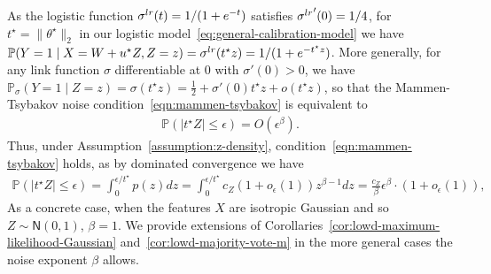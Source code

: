 \documentclass[11pt]{article}
\newcommand{\Prb}{\mathbb{P}}
\newcommand{\normal}{\mathsf{N}}
\newcommand{\lr}{^{\textup{lr}}}
\newcommand{\norms}[1]{\|{#1}\|} %
\newcommand{\ltwos}[1]{\norms{#1}_2} %
\newcommand{\<}{\langle} %
\renewcommand{\>}{\rangle}
\newcommand{\half}{\frac{1}{2}}
\newcommand{\opt}{^\star}
\begin{document}
As the logistic function $\sigma\lr(t) = 1/(1+e^{-t})$ satisfies
${\sigma\lr}'(0) = 1/4$, for $t\opt = \ltwos{\theta\opt}$ in our logistic
model~\eqref{eq:general-calibration-model} we have $\Prb(Y = 1 \mid X = W +
u\opt Z, Z = z) = \sigma\lr(t\opt z) = 1/(1 + e^{- t\opt z})$. More
generally, for any link function $\sigma$ differentiable at $0$ with
$\sigma'(0) > 0$, we have $\Prb_\sigma(Y = 1 \mid Z = z) = \sigma(t\opt z) =
\half + \sigma'(0) t\opt z + o(t\opt z)$, so that the Mammen-Tsybakov noise
condition~\eqref{eqn:mammen-tsybakov} is equivalent to
\begin{align*}
  \Prb \left( \left|t^\star Z \right| \leq \epsilon \right) = O(\epsilon^\beta).
\end{align*}
Thus,
under Assumption~\ref{assumption:z-density},
condition~\eqref{eqn:mammen-tsybakov} holds, as
by dominated convergence we have
\begin{align*}
  \Prb\left(|t\opt Z| \le \epsilon\right)
  = \int_0^{\epsilon/t\opt} p(z) dz
  = \int_0^{\epsilon/t\opt} c_Z(1 + o_\epsilon(1)) z^{\beta - 1} dz
  = \frac{c_Z}{\beta} \epsilon^\beta \cdot (1 + o_\epsilon(1)),
\end{align*}
As a concrete case, when the features $X$ are isotropic Gaussian and so $Z
\sim \normal(0, 1)$, $\beta=1$.  We provide extensions of
Corollaries~\ref{cor:lowd-maximum-likelihood-Gaussian}
and~\ref{cor:lowd-majority-vote-m} in the more general cases the noise
exponent $\beta$ allows.

\end{document}
